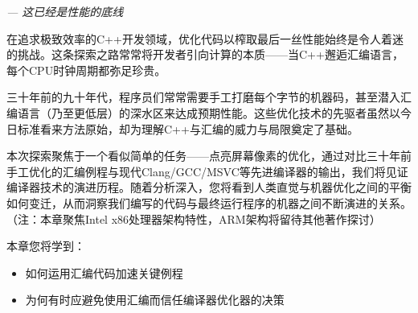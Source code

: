 \begin{flushright}
\textit{--- 这已经是性能的底线}
\end{flushright}

在追求极致效率的C++开发领域，优化代码以榨取最后一丝性能始终是令人着迷的挑战。这条探索之路常常将开发者引向计算的本质——当C++邂逅汇编语言，每个CPU时钟周期都弥足珍贵。

三十年前的九十年代，程序员们常常需要手工打磨每个字节的机器码，甚至潜入汇编语言（乃至更低层）的深水区来达成预期性能。这些优化技术的先驱者虽然以今日标准看来方法原始，却为理解C++与汇编的威力与局限奠定了基础。

本次探索聚焦于一个看似简单的任务——点亮屏幕像素的优化，通过对比三十年前手工优化的汇编例程与现代Clang/GCC/MSVC等先进编译器的输出，我们将见证编译器技术的演进历程。随着分析深入，您将看到人类直觉与机器优化之间的平衡如何变迁，从而洞察我们编写的代码与最终运行程序的机器之间不断演进的关系。（注：本章聚焦Intel x86处理器架构特性，ARM架构将留待其他著作探讨）

本章您将学到：

\begin{itemize}
\item 
如何运用汇编代码加速关键例程

\item 
为何有时应避免使用汇编而信任编译器优化器的决策
\end{itemize}


